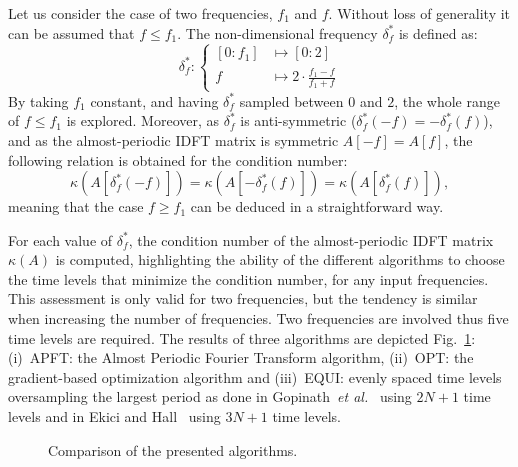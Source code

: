 Let us consider the case of two frequencies, $f_1$ and $f$. 
Without loss of generality it can be assumed that $f \leq f_1$.
The non-dimensional frequency $\delta_f^*$ is defined as:
\begin{equation}
    \delta_f^* \colon\begin{cases}
        [0: f_1] & \longmapsto[0: 2]\\
        f & \longmapsto 2 \cdot \displaystyle \frac{f_1 - f}{f_1 + f}
    \end{cases}
    \label{eq:delta_f}
\end{equation}
By taking $f_1$ constant, and having $\delta_f^*$ sampled between $0$
and $2$, the whole range of $f \leq f_1$ is explored. Moreover, as
$\delta_f^*$ is anti-symmetric ($\delta_f^*(-f) = - \delta_f^*(f)$), and as the almost-periodic IDFT matrix is symmetric $A[-f] = A[f]$, the following relation is obtained for the condition number:
\begin{equation}
  \kappa \left(A \left[\delta_f^*\left(-f\right)\right]\right) =
  \kappa \left(A \left[-\delta_f^*\left(f\right)\right]\right) 
  = \kappa \left(A \left[\delta_f^*\left(f\right)\right]\right),
  \label{eq:permutation}
\end{equation}
meaning that the case $f\geq f_1$ can be deduced in a straightforward
way.

For each value of $\delta_f^*$, the condition number of the
almost-periodic IDFT matrix $\kappa ( A )$ is computed, highlighting
the ability of the different algorithms to choose the time levels that
minimize the condition number, for any input frequencies. This
assessment is only valid for two frequencies, but the tendency is similar
when increasing the number of frequencies. Two frequencies are
involved thus five time levels are required. The results of three
algorithms are depicted Fig.~\ref{fig:bench_algo}: (i)~APFT: the
Almost Periodic Fourier Transform algorithm, (ii)~OPT: the
gradient-based optimization algorithm and (iii)~EQUI: evenly spaced
time levels oversampling the largest period as done in
Gopinath~\emph{et al.}~\cite{gopinath2007three} using $2N+1$ time
levels and in Ekici and Hall~\cite{Ekici2007, Ekici2008} using $3N+1$
time levels.
\begin{figure}[htb]
  \centering 
    \quad{}
  \caption{Comparison of the presented algorithms.}
  \label{fig:bench_algo}
\end{figure}

